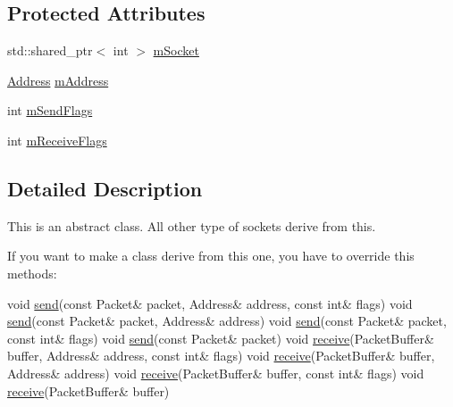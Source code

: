 \subsection*{Protected Attributes}
\begin{DoxyCompactItemize}
\item 
std\+::shared\+\_\+ptr$<$ int $>$ \hyperlink{classtnnf_1_1_socket_a85ca419f6b85101d19885eb72ce32f47}{m\+Socket}
\item 
\hyperlink{classtnnf_1_1_address}{Address} \hyperlink{classtnnf_1_1_socket_ac1e73970f545a227cafe59d06055894a}{m\+Address}
\item 
int \hyperlink{classtnnf_1_1_socket_af315481b3d9eee64a5b359dcbbe69567}{m\+Send\+Flags}
\item 
int \hyperlink{classtnnf_1_1_socket_ae341169968bd93277efa50933fb7e7a5}{m\+Receive\+Flags}
\end{DoxyCompactItemize}


\subsection{Detailed Description}
This is an abstract class. All other type of sockets derive from this. 

If you want to make a class derive from this one, you have to override this methods\+: 
\begin{DoxyCode}
\textcolor{keywordtype}{void} \hyperlink{classtnnf_1_1_socket_a26c6806603bc33f27f01ba55ce3630a1}{send}(\textcolor{keyword}{const} Packet& packet, Address& address, \textcolor{keyword}{const} \textcolor{keywordtype}{int}& flags)
\textcolor{keywordtype}{void} \hyperlink{classtnnf_1_1_socket_a26c6806603bc33f27f01ba55ce3630a1}{send}(\textcolor{keyword}{const} Packet& packet, Address& address)
\textcolor{keywordtype}{void} \hyperlink{classtnnf_1_1_socket_a26c6806603bc33f27f01ba55ce3630a1}{send}(\textcolor{keyword}{const} Packet& packet, \textcolor{keyword}{const} \textcolor{keywordtype}{int}& flags)
\textcolor{keywordtype}{void} \hyperlink{classtnnf_1_1_socket_a26c6806603bc33f27f01ba55ce3630a1}{send}(\textcolor{keyword}{const} Packet& packet)
\textcolor{keywordtype}{void} \hyperlink{classtnnf_1_1_socket_a0366ede12a56573b51e02c9a80b32595}{receive}(PacketBuffer& buffer, Address& address, \textcolor{keyword}{const} \textcolor{keywordtype}{int}& flags)
\textcolor{keywordtype}{void} \hyperlink{classtnnf_1_1_socket_a0366ede12a56573b51e02c9a80b32595}{receive}(PacketBuffer& buffer, Address& address)
\textcolor{keywordtype}{void} \hyperlink{classtnnf_1_1_socket_a0366ede12a56573b51e02c9a80b32595}{receive}(PacketBuffer& buffer, \textcolor{keyword}{const} \textcolor{keywordtype}{int}& flags)
\textcolor{keywordtype}{void} \hyperlink{classtnnf_1_1_socket_a0366ede12a56573b51e02c9a80b32595}{receive}(PacketBuffer& buffer)
\end{DoxyCode}
 

